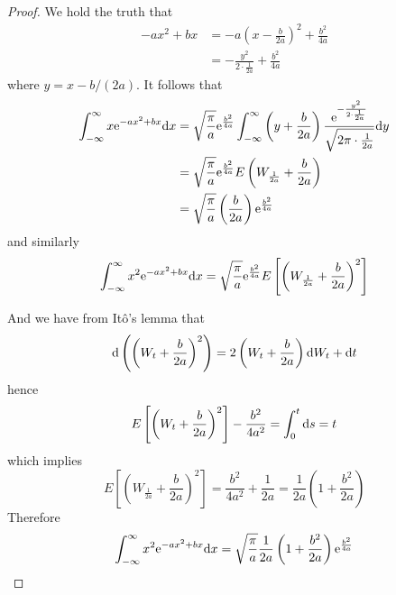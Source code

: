 \documentclass{homework}
\begin{document}
    \problem
    \begin{proof}
        We hold the truth that
        \[\begin{aligned}
            -ax^2+bx&=-a\left(x-\frac{b}{2a}\right)^2+\frac{b^2}{4a}\\
            &=-\frac{y^2}{2\cdot\frac{1}{2a}}+\frac{b^2}{4a}
        \end{aligned}\]
        where $y=x-b/(2a)$.
        It follows that
        \[\begin{aligned}
            \int_{-\infty}^\infty x\mathrm e^{-ax^2+bx}\mathrm d x
            &= \sqrt{\frac{\pi}{a}}\mathrm e^{\frac{b^2}{4a}}
            \int_{-\infty}^\infty \left(y+\frac{b}{2a}\right)
            \frac{\mathrm e^{-\frac{y^2}{2\cdot\frac{1}{2a}}}}{\sqrt{2\pi\cdot\frac{1}{2a}}}\mathrm d y\\
            &=\sqrt{\frac{\pi}{a}}\mathrm e^{\frac{b^2}{4a}}E\left(W_{\frac{1}{2a}}+\frac{b}{2a}\right)\\
            &=\sqrt{\frac{\pi}{a}}\left(\frac{b}{2a}\right)\mathrm e^{\frac{b^2}{4a}}
        \end{aligned}\]
        and similarly
        \[\begin{aligned}
            \int_{-\infty}^\infty x^2\mathrm e^{-ax^2+bx}\mathrm d x
            =\sqrt{\frac{\pi}{a}}\mathrm e^{\frac{b^2}{4a}}
            E\left[\left(W_{\frac{1}{2a}}+\frac{b}{2a}\right)^2\right]
        \end{aligned}\]
        
        And we have from It\^o's lemma that
        \[\mathrm d\left(\left(W_t+\frac{b}{2a}\right)^2\right)
        =2\left(W_t+\frac{b}{2a}\right)\mathrm d W_t+\mathrm d t\]
        hence
        \[E\left[\left(W_t+\frac{b}{2a}\right)^2\right]
        -\frac{b^2}{4a^2}=\int_0^t\mathrm d s=t\]
        which implies
        \[E\left[\left(W_{\frac{1}{2a}}+\frac{b}{2a}\right)^2\right]
        =\frac{b^2}{4a^2}+\frac{1}{2a}=\frac{1}{2a}\left(1+\frac{b^2}{2a}\right)\]
        Therefore
        \[\int_{-\infty}^\infty x^2\mathrm e^{-ax^2+bx}\mathrm d x
        =\sqrt{\frac{\pi}{a}}\frac{1}{2a}\left(1+\frac{b^2}{2a}\right)\mathrm e^{\frac{b^2}{4a}}\]
    \end{proof}
\end{document}
